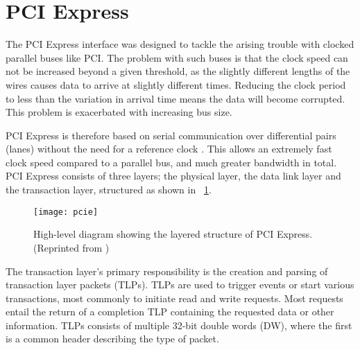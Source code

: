 
\section{PCI Express}

The PCI Express interface was designed to tackle the arising trouble with clocked parallel buses like PCI.
The problem with such buses is that the clock speed can not be increased beyond a given threshold, as the slightly different lengths of the wires causes data to arrive at slightly different times.
Reducing the clock period to less than the variation in arrival time means the data will become corrupted.
This problem is exacerbated with increasing bus size.

PCI Express is therefore based on serial communication over differential pairs (lanes\footnotemark) without the need for a reference clock \cite{pcie}.
This allows an extremely fast clock speed compared to a parallel bus, and much greater bandwidth in total.
PCI Express consists of three layers; the physical layer, the data link layer and the transaction layer, structured as shown in \figurename~\ref{fig:pcie}.

\begin{figure}[!ht]
    \centering
    \texttt{[image: pcie]}
    \caption[PCI Express structure]{
        High-level diagram showing the layered structure of PCI Express. (Reprinted from \cite{pcie})
    }
    \label{fig:pcie}
\end{figure}

The transaction layer's primary responsibility is the creation and parsing of transaction layer packets (TLPs).
TLPs are used to trigger events or start various transactions, most commonly to initiate read and write requests\footnotemark.
Most requests entail the return of a completion TLP containing the requested data or other information.
TLPs consists of multiple 32-bit double words (DW), where the first is a common header describing the type of packet.

